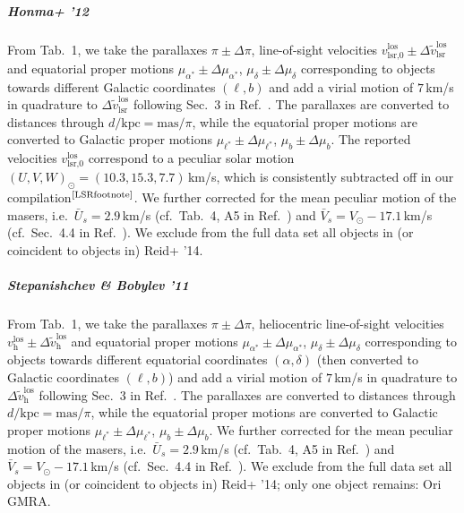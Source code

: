 \documentclass[twocolumn,prd,reprint,preprintnumbers,amsmath,amssymb,superscriptaddress,nofootinbib]{revtex4}
\begin{document}
\subparagraph{Honma+ '12 \cite{Honma2012}} From Tab.~1, we take the parallaxes $\pi\pm \Delta \pi$, line-of-sight velocities $v_{\textrm{lsr,0}}^{\textrm{los}}\pm \Delta \tilde{v}_{\textrm{lsr}}^{\textrm{los}}$ and equatorial proper motions $\mu_{\alpha^\ast}\pm \Delta \mu_{\alpha^\ast}$, $\mu_\delta\pm \Delta \mu_\delta$ corresponding to objects towards different Galactic coordinates $(\ell,b)$ and add a virial motion of $7\,$km/s in quadrature to $\Delta \tilde{v}_{\textrm{lsr}}^{\textrm{los}}$ following Sec.~3 in Ref.~\cite{Reid2009}. The parallaxes are converted to distances through $d/\textrm{kpc}=\textrm{mas}/\pi$, while the equatorial proper motions are converted to Galactic proper motions $\mu_{\ell^\ast}\pm \Delta \mu_{\ell^\ast}$, $\mu_b\pm \Delta \mu_b$. The reported velocities $v_{\textrm{lsr,0}}^{\textrm{los}}$ correspond to a peculiar solar motion $(U,V,W)_{\odot}=(10.3,15.3,7.7)\,$km/s, which is consistently subtracted off in our compilation$^\text{\ref{LSRfootnote}}$. We further corrected for the mean peculiar motion of the masers, i.e.~$\bar{U}_s=2.9\,$km/s (cf.~Tab.~4, A5 in Ref.~\cite{Reid2014}) and $\bar{V}_s=V_\odot-17.1\,$km/s (cf.~Sec.~4.4 in Ref.~\cite{Reid2014}). We exclude from the full data set all objects in (or coincident to objects in) Reid+ '14.

\subparagraph{Stepanishchev \& Bobylev '11 \cite{StepanishchevBobylev2011}} From Tab.~1, we take the parallaxes $\pi\pm \Delta \pi$, heliocentric line-of-sight velocities $v_{\textrm{h}}^{\textrm{los}}\pm \Delta \tilde{v}_{\textrm{h}}^{\textrm{los}}$ and equatorial proper motions $\mu_{\alpha^\ast}\pm \Delta \mu_{\alpha^\ast}$, $\mu_\delta\pm \Delta \mu_\delta$ corresponding to objects towards different equatorial coordinates $(\alpha,\delta)$ (then converted to Galactic coordinates $(\ell,b)$) and add a virial motion of $7\,$km/s in quadrature to $\Delta \tilde{v}_{\textrm{h}}^{\textrm{los}}$ following Sec.~3 in Ref.~\cite{Reid2009}. The parallaxes are converted to distances through $d/\textrm{kpc}=\textrm{mas}/\pi$, while the equatorial proper motions are converted to Galactic proper motions $\mu_{\ell^\ast}\pm \Delta \mu_{\ell^\ast}$, $\mu_b\pm \Delta \mu_b$. We further corrected for the mean peculiar motion of the masers, i.e.~$\bar{U}_s=2.9\,$km/s (cf.~Tab.~4, A5 in Ref.~\cite{Reid2014}) and $\bar{V}_s=V_\odot-17.1\,$km/s (cf.~Sec.~4.4 in Ref.~\cite{Reid2014}). We exclude from the full data set all objects in (or coincident to objects in) Reid+ '14; only one object remains: Ori GMRA.
\end{document}
